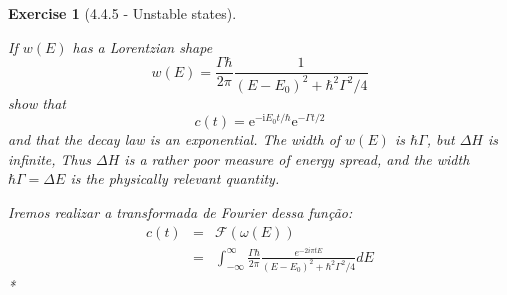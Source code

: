 \documentclass[12pt]{article}
\def\bea{\begin{eqnarray*}}
\def\eea{\end{eqnarray*}}
\def\l{\left}
\def\r{\right}
\newtheorem{exercise}{Exercise}
\begin{document}
\begin{exercise}[4.4.5 - Unstable states]
\begin{exercises}
			\item If $w(E)$ has a Lorentzian shape
			$$
			w(E)=\frac{\Gamma \hbar}{2 \pi} \frac{1}{\left(E-E_{0}\right)^{2}+\hbar^{2} \Gamma^{2} / 4}
			$$
			show that
			$$
			c(t)=\mathrm{e}^{-\mathrm{i} E_{0} t / \hbar} \mathrm{e}^{-\Gamma t / 2}
			$$
			and that the decay law is an exponential. The width of $w(E)$ is $\hbar \Gamma$, but $\Delta H$ is infinite, Thus $\Delta H$ is a rather poor measure of energy spread, and the width $\hbar \Gamma=\Delta E$ is the physically relevant quantity.
			\begin{multianswer}[true]
				Iremos realizar a transformada de Fourier dessa função:
				\bea
					c(t) &=& \mathcal{F}\l(\omega(E)\r) \\
						&=&  \int_{-\infty}^{\infty} \frac{\Gamma \hbar}{2 \pi} \frac{e^{-2i\pi tE}}{\left(E-E_{0}\right)^{2}+\hbar^{2} \Gamma^{2} / 4} dE
				\eea
				*
				
			\end{multianswer}
		\end{exercises}
	\end{exercise}
\end{document}
